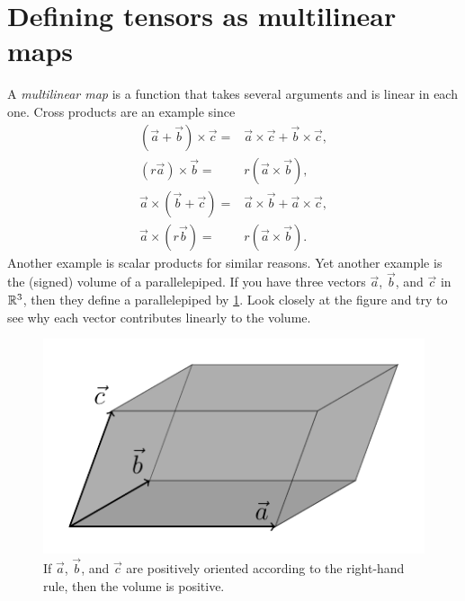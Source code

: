 \documentclass[english, 12pt]{article}
\begin{document}
\section{Defining tensors as multilinear maps}%
\label{sec:defining_tensors_as_multilinear_maps}

A \emph{multilinear map} is a function that takes several arguments and is linear in each one.
Cross products are an example since
\begin{align*}
	(\vec{a} + \vec{b}) \times \vec{c} ={}& \vec{a} \times \vec{c} + \vec{b} \times \vec{c},\\
	(r \vec{a}) \times \vec{b} ={}& r (\vec{a} \times \vec{b}),\\
	\vec{a} \times (\vec{b} + \vec{c}) ={}& \vec{a} \times \vec{b} + \vec{a} \times \vec{c},\\
	\vec{a} \times (r \vec{b}) ={}& r (\vec{a} \times \vec{b}).
\end{align*}
Another example is scalar products for similar reasons.
Yet another example is the (signed) volume of a parallelepiped.
If you have three vectors $\vec a$, $\vec b$, and $\vec c$ in $\mathbb{R}^3$, then they define a parallelepiped by \cref{fig:parallelepiped}.
Look closely at the figure and try to see why each vector contributes linearly to the volume.

\begin{figure}[ht]
	\centering
	\includegraphics[]{figures/parallelepiped.pdf}
	\caption{If $\vec a$, $\vec b$, and $\vec c$ are positively oriented according to the right-hand rule, then the volume is positive.}%
	\label{fig:parallelepiped}
\end{figure}
\end{document}
